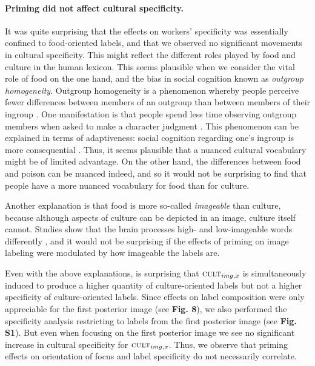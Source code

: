 \documentclass[a4paper]{report}
\begin{document}
\paragraph{Priming did not affect cultural specificity.}
It was quite surprising that the effects on workers' specificity was 
essentially
confined to food-oriented labels, and that we observed no significant movements
in cultural specificity.   This might reflect the different roles
played by food and culture in the human lexicon.  This seems plausible when we 
consider the vital role of food on the one hand, and the bias in social 
cognition known as \textit{outgroup homogeneity}\cite{Vala2012491,Ray2012387,Ishii2011159,Boldry2007157}.
Outgroup homogeneity is a phenomenon whereby people perceive fewer 
differences between members of an outgroup than between members of their 
ingroup \cite{Boldry2007157}.  One manifestation is that people 
spend less time observing outgroup members when asked to make a character 
judgment \cite{Vala2012491}.  This phenomenon can be explained in terms of 
adaptiveness: social cognition regarding one's ingroup is more consequential
\cite{Vala2012491}.  Thus, it seems plausible that a nuanced cultural 
vocabulary might be of limited advantage.  On the other hand,
the differences between food and poison can be nuanced indeed, and so it would
not be surprising to find that people have a more nuanced vocabulary for 
food than for culture.

Another explanation is that food is more so-called \textit{imageable} than 
culture, because although aspects of culture can be depicted in an image,
culture itself cannot.  Studies show that the brain processes high- and 
low-imageable words differently \cite{Swaab200299}, and it would not be 
surprising if the effects of priming on image labeling were modulated by how 
imageable the labels are.

Even with the above explanations, is surprising that 
$\textsc{cult}_{img,x}$ is simultaneously induced to 
produce a higher quantity of culture-oriented labels but not a higher
specificity of culture-oriented labels.  Since effects on 
label composition were only appreciable for the first posterior image 
(see \textbf{Fig. 8}), we also
performed the specificity analysis restricting to labels from the first
posterior image (see \textbf{Fig. S1}).  But even when focusing on the first 
posterior image we see no significant increase in cultural specificity for 
$\textsc{cult}_{img,x}$.  Thus, we observe that priming effects on 
orientation of focus and label specificity do not necessarily correlate.
\end{document}
